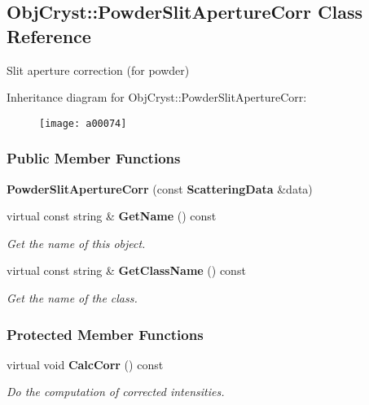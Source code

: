 \subsection{Obj\-Cryst\-:\-:Powder\-Slit\-Aperture\-Corr Class Reference}
\label{a00074}


Slit aperture correction (for powder)  


Inheritance diagram for Obj\-Cryst\-:\-:Powder\-Slit\-Aperture\-Corr\-:\begin{figure}[H]
\begin{center}
\leavevmode
\texttt{[image: a00074]}
\end{center}
\end{figure}
\subsubsection*{Public Member Functions}
\begin{DoxyCompactItemize}
\item 
{\bfseries Powder\-Slit\-Aperture\-Corr} (const {\bf Scattering\-Data} \&data)\label{a00074_a8c7814fd23c9e2fe96a904ea41137caf}

\item 
virtual const string \& {\bf Get\-Name} () const \label{a00074_a395cb337777d1c3fdd283f03c9a06e27}

\begin{DoxyCompactList}\small\item\em Get the name of this object. \end{DoxyCompactList}\item 
virtual const string \& {\bf Get\-Class\-Name} () const \label{a00074_a36c1dd123d3f951ba140796f47a68fbb}

\begin{DoxyCompactList}\small\item\em Get the name of the class. \end{DoxyCompactList}\end{DoxyCompactItemize}
\subsubsection*{Protected Member Functions}
\begin{DoxyCompactItemize}
\item 
virtual void {\bf Calc\-Corr} () const \label{a00074_ae7b2fecebc30de79ccc54f5237ec67f7}

\begin{DoxyCompactList}\small\item\em Do the computation of corrected intensities. \end{DoxyCompactList}\end{DoxyCompactItemize}
